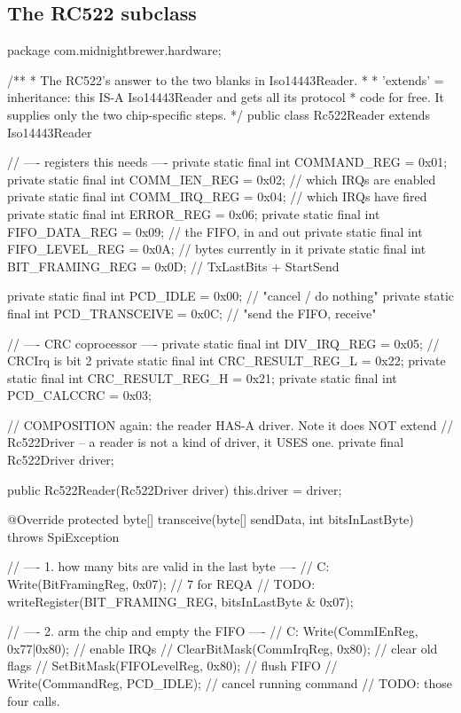 \subsection{The RC522 subclass}

\begin{jcode}
package com.midnightbrewer.hardware;

/**
 * The RC522's answer to the two blanks in Iso14443Reader.
 *
 * 'extends' = inheritance: this IS-A Iso14443Reader and gets all its protocol
 * code for free. It supplies only the two chip-specific steps.
 */
public class Rc522Reader extends Iso14443Reader {

    // ---- registers this needs ----
    private static final int COMMAND_REG     = 0x01;
    private static final int COMM_IEN_REG    = 0x02; // which IRQs are enabled
    private static final int COMM_IRQ_REG    = 0x04; // which IRQs have fired
    private static final int ERROR_REG       = 0x06;
    private static final int FIFO_DATA_REG   = 0x09; // the FIFO, in and out
    private static final int FIFO_LEVEL_REG  = 0x0A; // bytes currently in it
    private static final int BIT_FRAMING_REG = 0x0D; // TxLastBits + StartSend

    private static final int PCD_IDLE       = 0x00; // "cancel / do nothing"
    private static final int PCD_TRANSCEIVE = 0x0C; // "send the FIFO, receive"

    // ---- CRC coprocessor ----
    private static final int DIV_IRQ_REG      = 0x05; // CRCIrq is bit 2
    private static final int CRC_RESULT_REG_L = 0x22;
    private static final int CRC_RESULT_REG_H = 0x21;
    private static final int PCD_CALCCRC      = 0x03;

    // COMPOSITION again: the reader HAS-A driver. Note it does NOT extend
    // Rc522Driver -- a reader is not a kind of driver, it USES one.
    private final Rc522Driver driver;

    public Rc522Reader(Rc522Driver driver) {
        this.driver = driver;
    }

    @Override
    protected byte[] transceive(byte[] sendData, int bitsInLastByte)
            throws SpiException {

        // ---- 1. how many bits are valid in the last byte ----
        //   C: Write(BitFramingReg, 0x07);   // 7 for REQA
        // TODO: writeRegister(BIT_FRAMING_REG, bitsInLastByte & 0x07);

        // ---- 2. arm the chip and empty the FIFO ----
        //   C: Write(CommIEnReg, 0x77|0x80);   // enable IRQs
        //      ClearBitMask(CommIrqReg, 0x80); // clear old flags
        //      SetBitMask(FIFOLevelReg, 0x80); // flush FIFO
        //      Write(CommandReg, PCD_IDLE);    // cancel running command
        // TODO: those four calls.

}}
\end{jcode}

